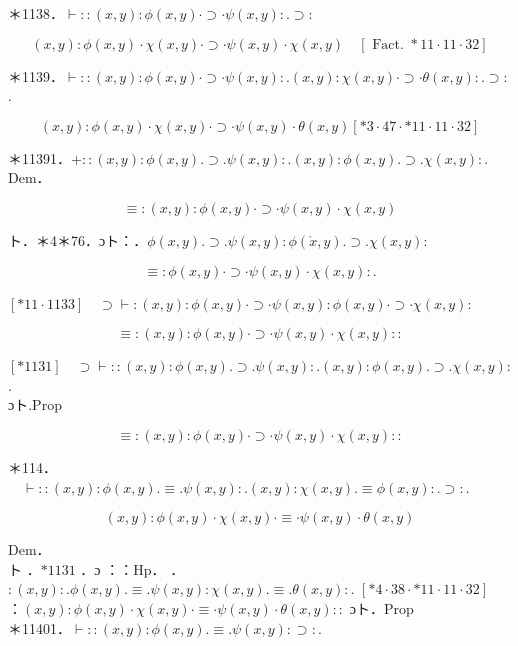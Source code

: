 \documentclass[10pt]{article}
\begin{document}
＊1138．$\vdash::(x, y): \phi(x, y) \cdot \supset \cdot \psi(x, y): . \supset:$

$$
(x, y): \phi(x, y) \cdot \chi(x, y) \cdot \supset \cdot \psi(x, y) \cdot \chi(x, y) \quad[\text { Fact. } * 11 \cdot 11 \cdot 32]
$$

＊1139．$\vdash::(x, y): \phi(x, y) \cdot \supset \cdot \psi(x, y): .(x, y): \chi(x, y) \cdot \supset \cdot \theta(x, y): . \supset:$.

$$
(x, y): \phi(x, y) \cdot \chi(x, y) \cdot \supset \cdot \psi(x, y) \cdot \theta(x, y)[* 3 \cdot 47 \cdot * 11 \cdot 11 \cdot 32]
$$

＊11391．$+::(x, y): \phi(x, y) . \supset . \psi(x, y): .(x, y): \phi(x, y) . \supset . \chi(x, y):$.\\
Dem．

$$
\equiv:(x, y): \phi(x, y) \cdot \supset \cdot \psi(x, y) \cdot \chi(x, y)
$$

ト．＊4＊76．ɔト：．$\phi(x, y) . \supset . \psi(x, y): \phi(\grave{x}, y) . \supset . \chi(x, y):$

$$
\equiv: \phi(x, y) \cdot \supset \cdot \psi(x, y) \cdot \chi(x, y): .
$$

$[* 11 \cdot 1133] \quad \supset \vdash:(x, y): \phi(x, y) \cdot \supset \cdot \psi(x, y): \phi(x, y) \cdot \supset \cdot \chi(x, y):$

$$
\equiv:(x, y): \phi(x, y) \cdot \supset \cdot \psi(x, y) \cdot \chi(x, y)::
$$

$[* 1131] \quad \supset \vdash::(x, y): \phi(x, y) . \supset . \psi(x, y): .(x, y): \phi(x, y) . \supset . \chi(x, y):$.\\
ɔト.Prop

$$
\equiv:(x, y): \phi(x, y) \cdot \supset \cdot \psi(x, y) \cdot \chi(x, y)::
$$

＊114．$\quad \vdash::(x, y): \phi(x, y) . \equiv . \psi(x, y): .(x, y): \chi(x, y) . \equiv \phi(x, y): . \supset:$.

$$
(x, y): \phi(x, y) \cdot \chi(x, y) \cdot \equiv \cdot \psi(x, y) \cdot \theta(x, y)
$$

Dem．\\
ト ．$* 1131$ ．ɔ ：：Hp． ．$:(x, y): . \phi(x, y) . \equiv . \psi(x, y): \chi(x, y) . \equiv . \theta(x, y):$. $[* 4 \cdot 38 \cdot * 11 \cdot 11 \cdot 32] \quad$ ：$(x, y): \phi(x, y) \cdot \chi(x, y) \cdot \equiv \cdot \psi(x, y) \cdot \theta(x, y)::$ ɔト．Prop\\
＊11401．$\vdash::(x, y): \phi(x, y) . \equiv . \psi(x, y): \supset:$.
\end{document}
